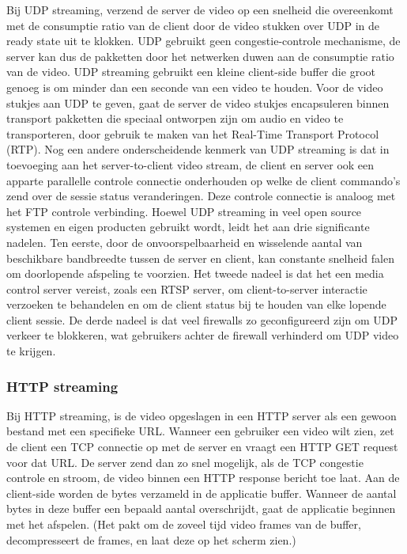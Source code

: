 \noindent Bij UDP streaming, verzend de server de video op een snelheid die overeenkomt met de consumptie ratio van de client door de video stukken over UDP in de ready state uit te klokken. UDP gebruikt geen congestie-controle mechanisme, de server kan dus de pakketten door het netwerken duwen aan de consumptie ratio van de video. UDP streaming gebruikt een kleine client-side buffer die groot genoeg is om minder dan een seconde van een video te houden. Voor de video stukjes aan UDP te geven, gaat de server de video stukjes encapsuleren binnen transport pakketten die speciaal ontworpen zijn om audio en video te transporteren, door gebruik te maken van het Real-Time Transport Protocol (RTP). Nog een andere onderscheidende kenmerk van UDP streaming is dat in toevoeging aan het server-to-client video stream, de client en server ook een apparte parallelle controle connectie onderhouden op welke de client commando’s zend over de sessie status veranderingen. Deze controle connectie is analoog met het FTP controle verbinding.
Hoewel UDP streaming in veel open source systemen en eigen producten gebruikt wordt, leidt het aan drie significante nadelen. Ten eerste, door de onvoorspelbaarheid en wisselende aantal van beschikbare bandbreedte tussen de server en client, kan constante snelheid falen om doorlopende afspeling te voorzien. Het tweede nadeel is dat het een media control server vereist, zoals een RTSP server, om client-to-server interactie verzoeken te behandelen en om de client status bij te houden van elke lopende client sessie. De derde nadeel is dat veel firewalls zo geconfigureerd zijn om UDP verkeer te blokkeren, wat gebruikers achter de firewall verhinderd om UDP video te krijgen.

\subsubsection{HTTP streaming}

\noindent Bij HTTP streaming, is de video opgeslagen in een HTTP server als een gewoon bestand met een specifieke URL. Wanneer een gebruiker een video wilt zien, zet de client een TCP connectie op met de server en vraagt een HTTP GET request voor dat URL. De server zend dan zo snel mogelijk, als de TCP congestie controle en stroom, de video binnen een HTTP response bericht toe laat. Aan de client-side worden de bytes verzameld in de applicatie buffer. Wanneer de aantal bytes in deze buffer een bepaald aantal overschrijdt, gaat de applicatie beginnen met het afspelen. (Het pakt om de zoveel tijd video frames van de buffer, decompresseert de frames, en laat deze op het scherm zien.)

